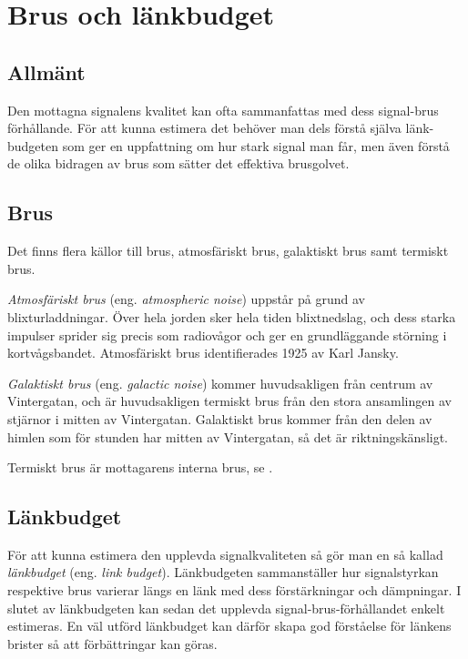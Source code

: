 \section{Brus och länkbudget}

\subsection{Allmänt}

Den mottagna signalens kvalitet kan ofta sammanfattas med dess signal-brus
förhållande.
För att kunna estimera det behöver man dels förstå själva länk-budgeten som
ger en uppfattning om hur stark signal man får, men även förstå de olika
bidragen av brus som sätter det effektiva brusgolvet.

\subsection{Brus}

Det finns flera källor till brus, atmosfäriskt brus, galaktiskt brus samt
termiskt brus.

\emph{Atmosfäriskt brus} (eng. \emph{atmospheric noise}) uppstår på grund av
blixturladdningar.
Över hela jorden sker hela tiden blixtnedslag, och dess starka impulser sprider
sig precis som radiovågor och ger en grundläggande störning i kortvågsbandet.
Atmosfäriskt brus identifierades 1925 av Karl Jansky.

\emph{Galaktiskt brus} (eng. \emph{galactic noise}) kommer huvudsakligen från
centrum av Vintergatan, och är huvudsakligen termiskt brus från den stora
ansamlingen av stjärnor i mitten av Vintergatan.
Galaktiskt brus kommer från den delen av himlen som för stunden har mitten av
Vintergatan, så det är riktningskänsligt.

Termiskt brus är mottagarens interna brus, se .

\subsection{Länkbudget}

För att kunna estimera den upplevda signalkvaliteten så gör man en så kallad
\emph{länkbudget} (eng. \emph{link budget}).
Länkbudgeten sammanställer hur signalstyrkan respektive brus varierar längs en
länk med dess förstärkningar och dämpningar.
I slutet av länkbudgeten kan sedan det upplevda signal-brus-förhållandet
enkelt estimeras.
En väl utförd länkbudget kan därför skapa god förståelse för länkens brister
så att förbättringar kan göras.

